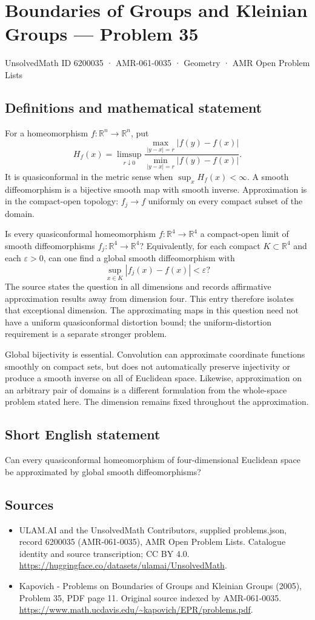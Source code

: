 \documentclass[11pt,a4paper]{article}
\begin{document}
\section*{Boundaries of Groups and Kleinian Groups — Problem 35}\label{6200035}
{\small UnsolvedMath ID 6200035 · AMR-061-0035 · Geometry · AMR Open Problem Lists}
\subsection{Definitions and mathematical statement}
For a homeomorphism $f:\mathbb R^n\to\mathbb R^n$, put
\[
 H_f(x)=\limsup_{r\downarrow0}
 \frac{\max_{|y-x|=r}|f(y)-f(x)|}
      {\min_{|y-x|=r}|f(y)-f(x)|}.
\]
It is quasiconformal in the metric sense when $\sup_x H_f(x)<\infty$. A smooth diffeomorphism is a bijective smooth map with smooth inverse. Approximation is in the compact-open topology: $f_j\to f$ uniformly on every compact subset of the domain.

Is every quasiconformal homeomorphism $f:\mathbb R^4\to\mathbb R^4$ a compact-open limit of smooth diffeomorphisms $f_j:\mathbb R^4\to\mathbb R^4$? Equivalently, for each compact $K\subset\mathbb R^4$ and each $\varepsilon>0$, can one find a global smooth diffeomorphism with
\[
 \sup_{x\in K}|f_j(x)-f(x)|<\varepsilon?
\]
The source states the question in all dimensions and records affirmative approximation results away from dimension four. This entry therefore isolates that exceptional dimension. The approximating maps in this question need not have a uniform quasiconformal distortion bound; the uniform-distortion requirement is a separate stronger problem.

Global bijectivity is essential. Convolution can approximate coordinate functions smoothly on compact sets, but does not automatically preserve injectivity or produce a smooth inverse on all of Euclidean space. Likewise, approximation on an arbitrary pair of domains is a different formulation from the whole-space problem stated here. The dimension remains fixed throughout the approximation.
\subsection{Short English statement}
Can every quasiconformal homeomorphism of four-dimensional Euclidean space be approximated by global smooth diffeomorphisms?
\subsection{Sources}
\begin{itemize}
\item[S1] ULAM.AI and the UnsolvedMath Contributors, supplied problems.json, record 6200035 (AMR-061-0035), AMR Open Problem Lists. Catalogue identity and source transcription; CC BY 4.0.
\url{https://huggingface.co/datasets/ulamai/UnsolvedMath}.
\item[S2] Kapovich - Problems on Boundaries of Groups and Kleinian Groups (2005), Problem 35, PDF page 11. Original source indexed by AMR-061-0035.
\url{https://www.math.ucdavis.edu/~kapovich/EPR/problems.pdf}.
\end{itemize}
\end{document}
